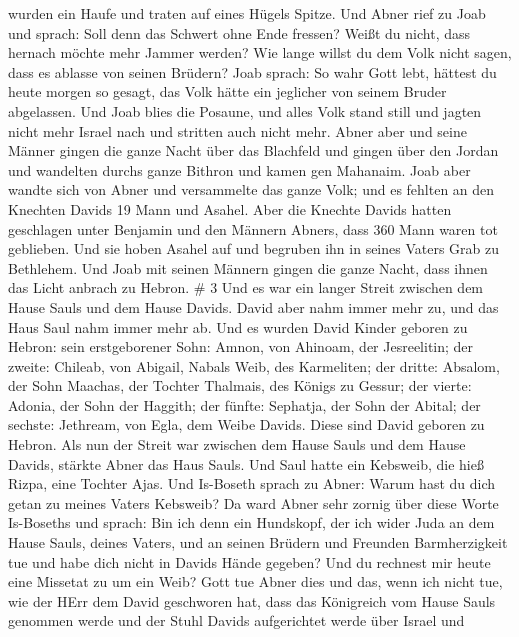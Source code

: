 wurden ein Haufe und traten auf eines Hügels Spitze.  Und
Abner rief zu Joab und sprach: Soll denn das Schwert ohne Ende fressen?
Weißt du nicht, dass hernach möchte mehr Jammer werden? Wie lange willst
du dem Volk nicht sagen, dass es ablasse von seinen Brüdern?
 Joab sprach: So wahr Gott lebt, hättest du heute morgen so
gesagt, das Volk hätte ein jeglicher von seinem Bruder abgelassen.
 Und Joab blies die Posaune, und alles Volk stand still und
jagten nicht mehr Israel nach und stritten auch nicht mehr.
 Abner aber und seine Männer gingen die ganze Nacht über
das Blachfeld und gingen über den Jordan und wandelten durchs ganze
Bithron und kamen gen Mahanaim.  Joab aber wandte sich von
Abner und versammelte das ganze Volk; und es fehlten an den Knechten
Davids 19 Mann und Asahel.  Aber die Knechte Davids hatten
geschlagen unter Benjamin und den Männern Abners, dass 360 Mann waren
tot geblieben.  Und sie hoben Asahel auf und begruben ihn
in seines Vaters Grab zu Bethlehem. Und Joab mit seinen Männern gingen
die ganze Nacht, dass ihnen das Licht anbrach zu Hebron. \# 3
 Und es war ein langer Streit zwischen dem Hause Sauls und
dem Hause Davids. David aber nahm immer mehr zu, und das Haus Saul nahm
immer mehr ab.  Und es wurden David Kinder geboren zu
Hebron: sein erstgeborener Sohn: Amnon, von Ahinoam, der Jesreelitin;
 der zweite: Chileab, von Abigail, Nabals Weib, des
Karmeliten; der dritte: Absalom, der Sohn Maachas, der Tochter Thalmais,
des Königs zu Gessur;  der vierte: Adonia, der Sohn der
Haggith; der fünfte: Sephatja, der Sohn der Abital;  der
sechste: Jethream, von Egla, dem Weibe Davids. Diese sind David geboren
zu Hebron.  Als nun der Streit war zwischen dem Hause Sauls
und dem Hause Davids, stärkte Abner das Haus Sauls.  Und
Saul hatte ein Kebsweib, die hieß Rizpa, eine Tochter Ajas. Und
Is-Boseth sprach zu Abner: Warum hast du dich getan zu meines Vaters
Kebsweib?  Da ward Abner sehr zornig über diese Worte
Is-Boseths und sprach: Bin ich denn ein Hundskopf, der ich wider Juda an
dem Hause Sauls, deines Vaters, und an seinen Brüdern und Freunden
Barmherzigkeit tue und habe dich nicht in Davids Hände gegeben? Und du
rechnest mir heute eine Missetat zu um ein Weib?  Gott tue
Abner dies und das, wenn ich nicht tue, wie der HErr dem David
geschworen hat,  dass das Königreich vom Hause Sauls
genommen werde und der Stuhl Davids aufgerichtet werde über Israel und
